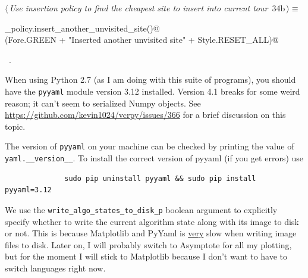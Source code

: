\documentclass[11.5pt]{report}
\begin{document}
\begin{flushleft} \small\label{scrap28}\raggedright\small
{} $\langle\,${\itshape Use insertion policy to find the cheapest site to insert into current tour}\nobreak\ {\footnotesize {34b}}$\,\rangle\equiv$
\vspace{-1ex}
\begin{list}{}{} \item
\mbox{}\verb@insertion_policy.insert_another_unvisited_site()@\\
\mbox{}\verb@debug(Fore.GREEN + "Inserted another unvisited site" + Style.RESET_ALL)@\\
\mbox{}\verb@@{\NWsep}
\end{list}
\vspace{-1.5ex}
\footnotesize
\begin{list}{}{\setlength{\itemsep}{-\parsep}\setlength{\itemindent}{-\leftmargin}}
\item \NWtxtMacroRefIn\ .

\item{}
\end{list}
\vspace{4ex}
\end{flushleft}
\vspace{-0.8cm}\newchunk When using Python 2.7 (as I am doing with this suite of programs), you should have the 
\texttt{pyyaml} module version 3.12 installed. Version 4.1 breaks for some weird reason; it can't seem to serialized
Numpy objects. See \url{https://github.com/kevin1024/vcrpy/issues/366} for a brief discussion on this topic. 

The version of \verb|pyyaml| on your machine can be checked by printing the value of \verb|yaml.__version__|. 
To install the correct version of pyyaml (if you get errors)  use

\begin{verbatim} 
              sudo pip uninstall pyyaml && sudo pip install pyyaml=3.12
\end{verbatim}

\newchunk We use the \verb|write_algo_states_to_disk_p| boolean argument to explicitly specify whether to write 
the current algorithm state along with its image to disk or not. This is because Matplotlib and PyYaml
is \underline{very} slow when writing image files to disk. Later on, I will probably switch to Asymptote 
for all my plotting, but for the moment I will stick to Matplotlib because I don't want to have to switch languages right now. 
 
\end{document}

